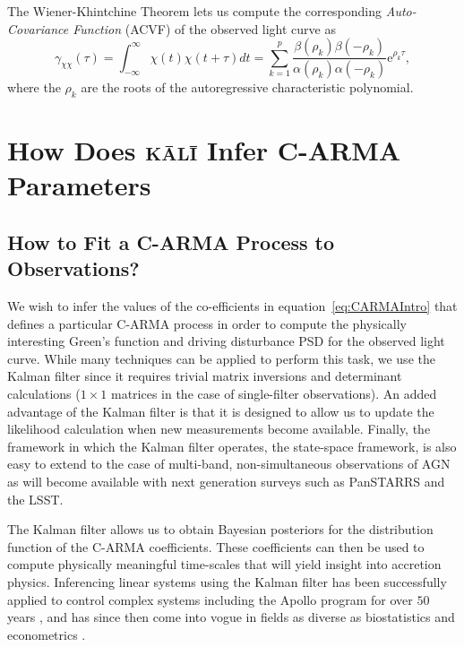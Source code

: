 \documentclass[a4paper,fleqn,usenatbib]{mnras}
\begin{document}
The Wiener-Khintchine Theorem lets us compute the corresponding \textit{Auto-Covariance Function} (ACVF) of the observed light curve \citep{HandbookOfStatistics19Brockwell} as
\begin{equation}\label{eq:CARMAACVF}
\gamma_{\chi\chi}(\tau) = \int_{-\infty}^{\infty}\chi(t)\chi(t + \tau) dt = \sum_{k = 1}^{p} \frac{\beta(\rho_{k}) \beta(-\rho_{k})}{\alpha(\rho_{k})\alpha(-\rho_{k})}\mathrm{e}^{\rho_{k} \tau},
\end{equation}
where the $\rho_{k}$ are the roots of the autoregressive characteristic polynomial.

\section[\textsc{k\={a}l\={i}}]{How Does \textsc{k\={a}l\={i}} Infer C-ARMA Parameters}\label{sec:kali}

\subsection[Fitting C-ARMA Processes]{How to Fit a C-ARMA Process to Observations?}\label{sec:Fitting}

We wish to infer the values of the co-efficients in equation~\eqref{eq:CARMAIntro} that defines a particular C-ARMA process in order to compute the physically interesting Green's function and driving disturbance PSD for the observed light curve. While many techniques can be applied to perform this task, we use the Kalman filter \citep{Kalman60, Simon} since it requires trivial matrix inversions and determinant calculations ($1 \times 1$ matrices in the case of single-filter observations). An added advantage of the Kalman filter is that it is designed to allow us to update the likelihood calculation when new measurements become available. Finally, the framework in which the Kalman filter operates, the state-space framework, is also easy to extend to the case of multi-band, non-simultaneous observations of AGN as will become available with next generation surveys such as PanSTARRS and the LSST.

The Kalman filter allows us to obtain Bayesian posteriors for the distribution function of the C-ARMA coefficients. These coefficients can then be used to compute physically meaningful time-scales that will yield insight into accretion physics. Inferencing linear systems using the Kalman filter has been successfully applied to control complex systems including the Apollo program for over $50$ years \citep{GrewalAndrews10}, and has since then come into vogue in fields as diverse as biostatistics \citep{Jones} and econometrics \citep{DurbinKoopman,Harvey}.
\end{document}
